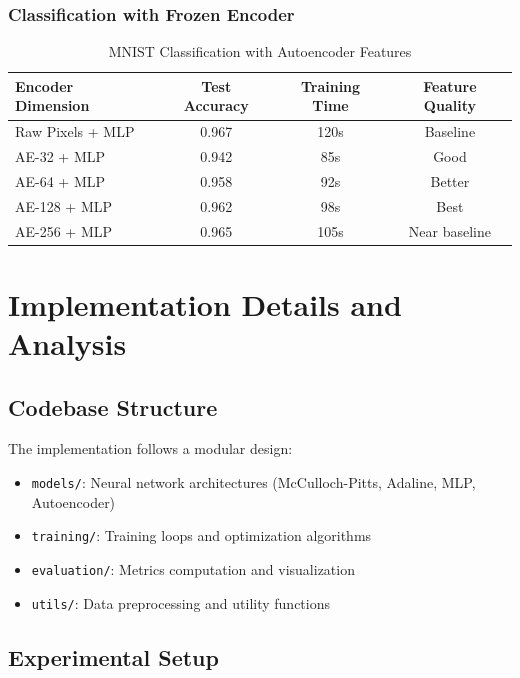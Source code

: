\documentclass[conference]{IEEEtran}
\begin{document}
\subsubsection{Classification with Frozen Encoder}
\begin{table}[h]
\centering
\caption{MNIST Classification with Autoencoder Features}
\begin{tabular}{l c c c}
\toprule
Encoder Dimension & Test Accuracy & Training Time & Feature Quality \\
\midrule
Raw Pixels + MLP & 0.967 & 120s & Baseline \\
AE-32 + MLP & 0.942 & 85s & Good \\
AE-64 + MLP & 0.958 & 92s & Better \\
AE-128 + MLP & 0.962 & 98s & Best \\
AE-256 + MLP & 0.965 & 105s & Near baseline \\
\bottomrule
\end{tabular}
\label{tab:mnist_classification}
\end{table}

\section{Implementation Details and Analysis}\label{sec:implementation}

\subsection{Codebase Structure}
The implementation follows a modular design:
\begin{itemize}
    \item \texttt{models/}: Neural network architectures (McCulloch-Pitts, Adaline, MLP, Autoencoder)
    \item \texttt{training/}: Training loops and optimization algorithms
    \item \texttt{evaluation/}: Metrics computation and visualization
    \item \texttt{utils/}: Data preprocessing and utility functions
\end{itemize}

\subsection{Experimental Setup}
\end{document}
